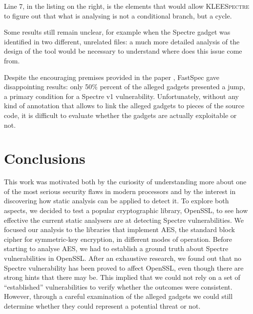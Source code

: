 \documentclass[target=mst,aauheader=aics]{thud}
\theoremstyle{definition}
\begin{document}
Line 7, in the listing on the right, is the elements that would allow \textsc{KLEESpectre} to figure out that what is analysing is not a conditional branch, but a cycle.

Some results still remain unclear, for example when the Spectre gadget was identified in two different, unrelated files: a much more detailed analysis of the design of the tool would be necessary to understand where does this issue come from.

Despite the encouraging premises provided in the paper \cite{Tol2021}, FastSpec gave disappointing results: only 50\% percent of the alleged gadgets presented a jump, a primary condition for a Spectre v1 vulnerability. Unfortunately, without any kind of annotation that allows to link the alleged gadgets to pieces of the source code, it is difficult to evaluate whether the gadgets are actually exploitable or not.

\chapter{Conclusions}\label{conclusions}

This work was motivated both by the curiosity of understanding more about one of the most serious security flaws in modern processors and by the interest in discovering how static analysis can be applied to detect it. To explore both aspects, we decided to test a popular cryptographic library, OpenSSL, to see how effective the current static analysers are at detecting Spectre vulnerabilities. We focused our analysis to the libraries that implement AES, the standard block cipher for symmetric-key encryption, in different modes of operation. Before starting to analyse AES, we had to establish a ground truth about Spectre vulnerabilities in OpenSSL. After an exhaustive research, we found out that no Spectre vulnerability has been proved to affect OpenSSL, even though there are strong hints that there may be. This implied that we could not rely on a set of ``established'' vulnerabilities to verify whether the outcomes were consistent. However, through a careful examination of the alleged gadgets we could still determine whether they could represent a potential threat or not.
\end{document}
